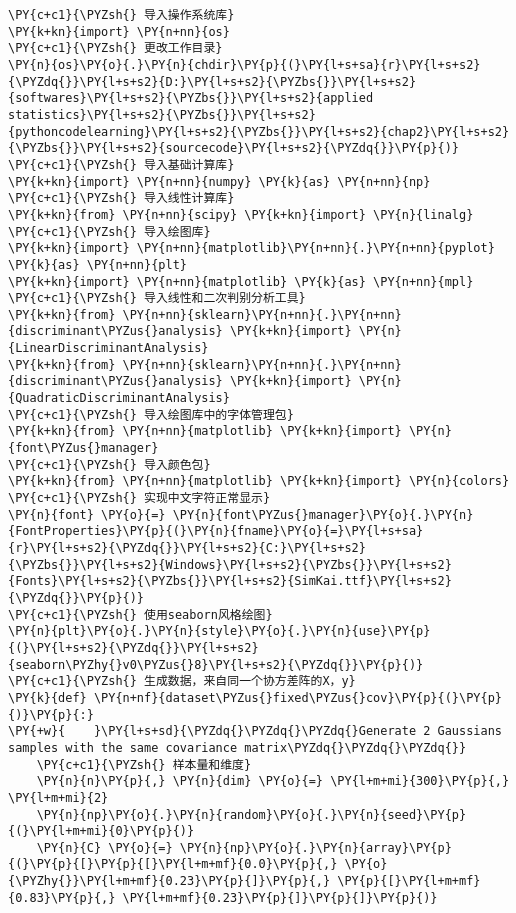\begin{Verbatim}[commandchars=\\\{\}]
\PY{c+c1}{\PYZsh{} 导入操作系统库}
\PY{k+kn}{import} \PY{n+nn}{os}
\PY{c+c1}{\PYZsh{} 更改工作目录}
\PY{n}{os}\PY{o}{.}\PY{n}{chdir}\PY{p}{(}\PY{l+s+sa}{r}\PY{l+s+s2}{\PYZdq{}}\PY{l+s+s2}{D:}\PY{l+s+s2}{\PYZbs{}}\PY{l+s+s2}{softwares}\PY{l+s+s2}{\PYZbs{}}\PY{l+s+s2}{applied statistics}\PY{l+s+s2}{\PYZbs{}}\PY{l+s+s2}{pythoncodelearning}\PY{l+s+s2}{\PYZbs{}}\PY{l+s+s2}{chap2}\PY{l+s+s2}{\PYZbs{}}\PY{l+s+s2}{sourcecode}\PY{l+s+s2}{\PYZdq{}}\PY{p}{)}
\PY{c+c1}{\PYZsh{} 导入基础计算库}
\PY{k+kn}{import} \PY{n+nn}{numpy} \PY{k}{as} \PY{n+nn}{np}
\PY{c+c1}{\PYZsh{} 导入线性计算库}
\PY{k+kn}{from} \PY{n+nn}{scipy} \PY{k+kn}{import} \PY{n}{linalg}
\PY{c+c1}{\PYZsh{} 导入绘图库}
\PY{k+kn}{import} \PY{n+nn}{matplotlib}\PY{n+nn}{.}\PY{n+nn}{pyplot} \PY{k}{as} \PY{n+nn}{plt}
\PY{k+kn}{import} \PY{n+nn}{matplotlib} \PY{k}{as} \PY{n+nn}{mpl}
\PY{c+c1}{\PYZsh{} 导入线性和二次判别分析工具}
\PY{k+kn}{from} \PY{n+nn}{sklearn}\PY{n+nn}{.}\PY{n+nn}{discriminant\PYZus{}analysis} \PY{k+kn}{import} \PY{n}{LinearDiscriminantAnalysis}
\PY{k+kn}{from} \PY{n+nn}{sklearn}\PY{n+nn}{.}\PY{n+nn}{discriminant\PYZus{}analysis} \PY{k+kn}{import} \PY{n}{QuadraticDiscriminantAnalysis}
\PY{c+c1}{\PYZsh{} 导入绘图库中的字体管理包}
\PY{k+kn}{from} \PY{n+nn}{matplotlib} \PY{k+kn}{import} \PY{n}{font\PYZus{}manager}
\PY{c+c1}{\PYZsh{} 导入颜色包}
\PY{k+kn}{from} \PY{n+nn}{matplotlib} \PY{k+kn}{import} \PY{n}{colors}
\PY{c+c1}{\PYZsh{} 实现中文字符正常显示}
\PY{n}{font} \PY{o}{=} \PY{n}{font\PYZus{}manager}\PY{o}{.}\PY{n}{FontProperties}\PY{p}{(}\PY{n}{fname}\PY{o}{=}\PY{l+s+sa}{r}\PY{l+s+s2}{\PYZdq{}}\PY{l+s+s2}{C:}\PY{l+s+s2}{\PYZbs{}}\PY{l+s+s2}{Windows}\PY{l+s+s2}{\PYZbs{}}\PY{l+s+s2}{Fonts}\PY{l+s+s2}{\PYZbs{}}\PY{l+s+s2}{SimKai.ttf}\PY{l+s+s2}{\PYZdq{}}\PY{p}{)}
\PY{c+c1}{\PYZsh{} 使用seaborn风格绘图}
\PY{n}{plt}\PY{o}{.}\PY{n}{style}\PY{o}{.}\PY{n}{use}\PY{p}{(}\PY{l+s+s2}{\PYZdq{}}\PY{l+s+s2}{seaborn\PYZhy{}v0\PYZus{}8}\PY{l+s+s2}{\PYZdq{}}\PY{p}{)}
\PY{c+c1}{\PYZsh{} 生成数据，来自同一个协方差阵的X，y}
\PY{k}{def} \PY{n+nf}{dataset\PYZus{}fixed\PYZus{}cov}\PY{p}{(}\PY{p}{)}\PY{p}{:}
\PY{+w}{    }\PY{l+s+sd}{\PYZdq{}\PYZdq{}\PYZdq{}Generate 2 Gaussians samples with the same covariance matrix\PYZdq{}\PYZdq{}\PYZdq{}}
    \PY{c+c1}{\PYZsh{} 样本量和维度}
    \PY{n}{n}\PY{p}{,} \PY{n}{dim} \PY{o}{=} \PY{l+m+mi}{300}\PY{p}{,} \PY{l+m+mi}{2}
    \PY{n}{np}\PY{o}{.}\PY{n}{random}\PY{o}{.}\PY{n}{seed}\PY{p}{(}\PY{l+m+mi}{0}\PY{p}{)}
    \PY{n}{C} \PY{o}{=} \PY{n}{np}\PY{o}{.}\PY{n}{array}\PY{p}{(}\PY{p}{[}\PY{p}{[}\PY{l+m+mf}{0.0}\PY{p}{,} \PY{o}{\PYZhy{}}\PY{l+m+mf}{0.23}\PY{p}{]}\PY{p}{,} \PY{p}{[}\PY{l+m+mf}{0.83}\PY{p}{,} \PY{l+m+mf}{0.23}\PY{p}{]}\PY{p}{]}\PY{p}{)}

\end{Verbatim}
